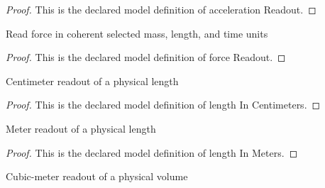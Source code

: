 \begin{proof}
  This is the declared model definition of acceleration Readout.
\end{proof}
\begin{definition}
  \label{def:physics:phyx-mini-0722:phyxminiproblems-problemphyxmini0722-forcereadout}
  Read force in coherent selected mass, length, and time units
\end{definition}
\begin{proof}
  This is the declared model definition of force Readout.
\end{proof}
\begin{definition}
  \label{def:physics:phyx-mini-0722:phyxminiproblems-problemphyxmini0722-lengthincentimeters}
  Centimeter readout of a physical length
\end{definition}
\begin{proof}
  This is the declared model definition of length In Centimeters.
\end{proof}
\begin{definition}
  \label{def:physics:phyx-mini-0722:phyxminiproblems-problemphyxmini0722-lengthinmeters}
  Meter readout of a physical length
\end{definition}
\begin{proof}
  This is the declared model definition of length In Meters.
\end{proof}
\begin{definition}
  \label{def:physics:phyx-mini-0722:phyxminiproblems-problemphyxmini0722-volumeincubicmeters}
  Cubic-meter readout of a physical volume
\end{definition}
